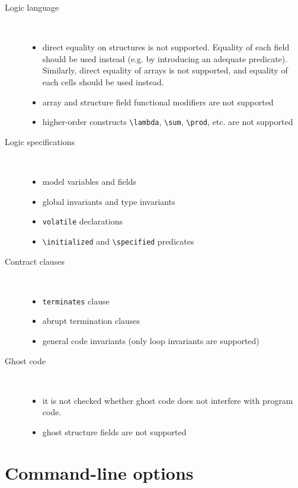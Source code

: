 \documentclass[a4paper,11pt,twoside,openright]{report}
\begin{document}
\begin{description}
\item[Logic language] ~\\
  \begin{itemize}
  \item direct equality on structures is not supported. Equality of
    each field should be used instead (e.g. by introducing an adequate
    predicate). Similarly, direct equality of arrays is not supported,
    and equality of each cells should be used instead.
  \item array and structure field functional modifiers are not supported
  \item higher-order constructs \verb|\lambda|, \verb|\sum|,
    \verb|\prod|, etc. are not supported
  \end{itemize}
\item[Logic specifications] ~\\
  \begin{itemize}
  \item model variables and fields
  \item global invariants and type invariants
  \item \verb|volatile| declarations
  \item \verb|\initialized| and \verb|\specified| predicates
  \end{itemize}
\item[Contract clauses] ~\\
  \begin{itemize}
  \item \texttt{terminates} clause
  \item abrupt termination clauses
  \item general code invariants (only loop invariants are supported)
  \end{itemize}
\item[Ghost code] ~\\
  \begin{itemize}
  \item it is not checked whether ghost code does not interfere with
    program code.
  \item ghost structure fields are not supported
  \end{itemize}

\end{description}

\section{Command-line options}
\end{document}
